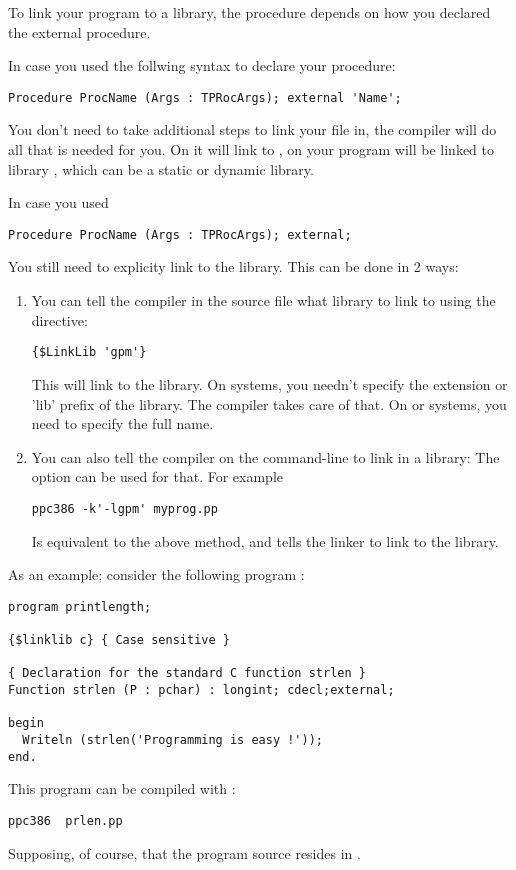 \documentclass{report}
\begin{document}
To link your program to a library, the procedure depends on how you declared
the external procedure.

In case you used the follwing syntax to declare your procedure:
\begin{verbatim}
Procedure ProcName (Args : TPRocArgs); external 'Name';
\end{verbatim}
You don't need to take additional steps to link your file in, the compiler
will do all that is needed for you. On \windowsnt it will link to
, on \linux your program will be linked to library
, which can be a static or dynamic library.

In case you used
\begin{verbatim}
Procedure ProcName (Args : TPRocArgs); external;
\end{verbatim}
You still need to explicity link to the library. This can be done in 2 ways:
\begin{enumerate}
\item You can tell the compiler in the source file what library to link to
using the  directive:
\begin{verbatim}
{$LinkLib 'gpm'}
\end{verbatim}
This will link to the  library. On \linux systems, you needn't
specify the extension or 'lib' prefix of the library. The compiler takes
care of that. On \dos or \windows systems, you need to specify the full
name.
\item You can also tell the compiler on the command-line to link in a
library: The  option can be used for that. For example
\begin{verbatim}
ppc386 -k'-lgpm' myprog.pp
\end{verbatim}
Is equivalent to the above method, and tells the linker to link to the
 library.
\end{enumerate}

As an example; consider the following program :
\begin{verbatim}
program printlength;

{$linklib c} { Case sensitive }

{ Declaration for the standard C function strlen }
Function strlen (P : pchar) : longint; cdecl;external;

begin
  Writeln (strlen('Programming is easy !'));
end.
\end{verbatim}
This program can be compiled with :
\begin{verbatim}
ppc386  prlen.pp
\end{verbatim}
Supposing, of course, that the program source resides in .
\end{document}
